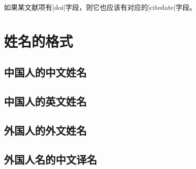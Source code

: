 如果某文献项有|doi|字段，则它也应该有对应的|citedate|字段。


\section{姓名的格式}\label{sec:names}

\subsection{中国人的中文姓名}

\subsection{中国人的英文姓名}

\subsection{外国人的外文姓名}

\subsection{外国人名的中文译名}


